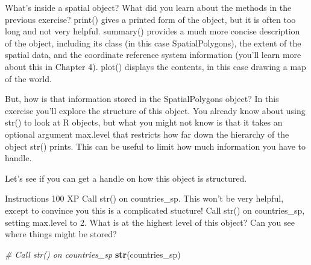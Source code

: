 \documentclass[]{article}
\newenvironment{Shaded}{\begin{snugshade}}{\end{snugshade}}
\newcommand{\CommentTok}[1]{\textcolor[rgb]{0.56,0.35,0.01}{\textit{#1}}}
\newcommand{\KeywordTok}[1]{\textcolor[rgb]{0.13,0.29,0.53}{\textbf{#1}}}
\newcommand{\NormalTok}[1]{#1}
\begin{document}
What's inside a spatial object? What did you learn about the methods in
the previous exercise? print() gives a printed form of the object, but
it is often too long and not very helpful. summary() provides a much
more concise description of the object, including its class (in this
case SpatialPolygons), the extent of the spatial data, and the
coordinate reference system information (you'll learn more about this in
Chapter 4). plot() displays the contents, in this case drawing a map of
the world.

But, how is that information stored in the SpatialPolygons object? In
this exercise you'll explore the structure of this object. You already
know about using str() to look at R objects, but what you might not know
is that it takes an optional argument max.level that restricts how far
down the hierarchy of the object str() prints. This can be useful to
limit how much information you have to handle.

Let's see if you can get a handle on how this object is structured.

Instructions 100 XP Call str() on countries\_sp. This won't be very
helpful, except to convince you this is a complicated stucture! Call
str() on countries\_sp, setting max.level to 2. What is at the highest
level of this object? Can you see where things might be stored?

\begin{Shaded}
\begin{Highlighting}[]
\CommentTok{# Call str() on countries_sp}
\KeywordTok{str}\NormalTok{(countries_sp)}
\end{Highlighting}
\end{Shaded}
\end{document}

